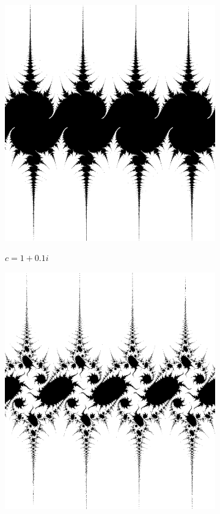 \begin{figure}[!htb]
\begin{subfigure}{1.0\textwidth}
        \includegraphics[width=\linewidth]{./images/opencal/julia2.png}
        \label{fig:julia2}
        \caption{$c=1+0.1i$}
    \end{subfigure}
    \endminipage\hfill
    \begin{subfigure}{1.0\textwidth}
    \includegraphics[width=\linewidth]{./images/opencal/julia3.png}

\end{subfigure}
\end{figure}
